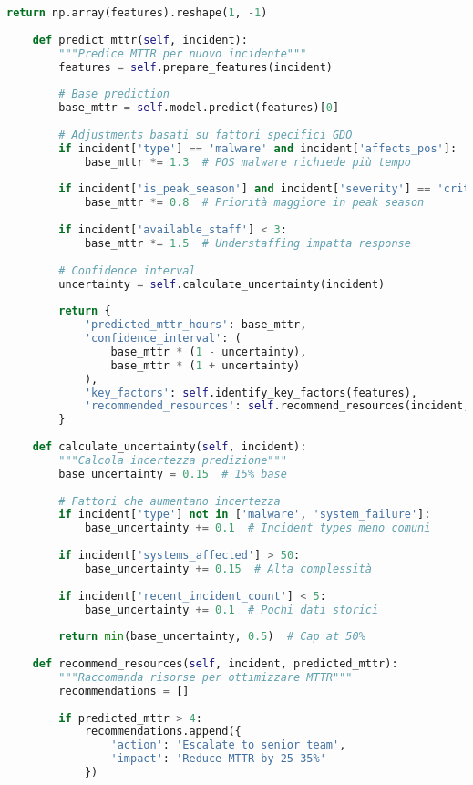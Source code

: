 \begin{lstlisting}[language=Python, caption=Predizione MTTR per Incident Response]
        return np.array(features).reshape(1, -1)
    
    def predict_mttr(self, incident):
        """Predice MTTR per nuovo incidente"""
        features = self.prepare_features(incident)
        
        # Base prediction
        base_mttr = self.model.predict(features)[0]
        
        # Adjustments basati su fattori specifici GDO
        if incident['type'] == 'malware' and incident['affects_pos']:
            base_mttr *= 1.3  # POS malware richiede più tempo
            
        if incident['is_peak_season'] and incident['severity'] == 'critical':
            base_mttr *= 0.8  # Priorità maggiore in peak season
            
        if incident['available_staff'] < 3:
            base_mttr *= 1.5  # Understaffing impatta response
        
        # Confidence interval
        uncertainty = self.calculate_uncertainty(incident)
        
        return {
            'predicted_mttr_hours': base_mttr,
            'confidence_interval': (
                base_mttr * (1 - uncertainty),
                base_mttr * (1 + uncertainty)
            ),
            'key_factors': self.identify_key_factors(features),
            'recommended_resources': self.recommend_resources(incident, base_mttr)
        }
    
    def calculate_uncertainty(self, incident):
        """Calcola incertezza predizione"""
        base_uncertainty = 0.15  # 15% base
        
        # Fattori che aumentano incertezza
        if incident['type'] not in ['malware', 'system_failure']:
            base_uncertainty += 0.1  # Incident types meno comuni
            
        if incident['systems_affected'] > 50:
            base_uncertainty += 0.15  # Alta complessità
            
        if incident['recent_incident_count'] < 5:
            base_uncertainty += 0.1  # Pochi dati storici
        
        return min(base_uncertainty, 0.5)  # Cap at 50%
    
    def recommend_resources(self, incident, predicted_mttr):
        """Raccomanda risorse per ottimizzare MTTR"""
        recommendations = []
        
        if predicted_mttr > 4:
            recommendations.append({
                'action': 'Escalate to senior team',
                'impact': 'Reduce MTTR by 25-35%'
            })
            

\end{lstlisting}

